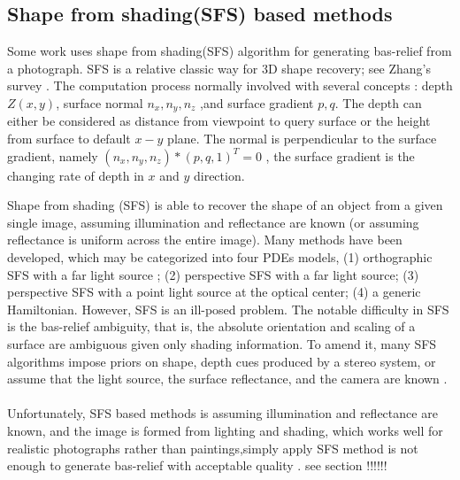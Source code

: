 \subsection{Shape from shading(SFS) based methods}
Some work uses shape from shading(SFS) algorithm for generating  bas-relief from a photograph. SFS is a relative classic way for 3D shape recovery; see Zhang's survey \cite{zhang1999shape}.  The computation process normally involved with several concepts : depth $Z(x,y)$, surface normal $n_x,n_y,n_z$ ,and surface gradient $p,q$. The depth can either be considered as distance from viewpoint to query surface or the height from surface to default $x-y$ plane. The normal is perpendicular to the surface gradient, namely $\left( n_x,n_y,n_z\right) * \left( p, q ,1\right)^T =0  $ , the surface gradient is the changing rate of depth in $x$ and $y$ direction.

Shape from shading (SFS) is able to recover the shape of an object from a given single image, assuming illumination and reflectance are known (or assuming reflectance is uniform across the entire image). Many methods have been developed, which may be categorized into four PDEs models\cite{prados2003perspective}, (1) orthographic SFS with a far light source \cite{lions1993shape}; (2) perspective SFS with a far light source\cite{prados2004unifying}; (3) perspective SFS with a point light source at the optical center\cite{prados2003perspective}; (4) a generic Hamiltonian. However, SFS is an ill-posed problem. The notable difficulty in SFS is the bas-relief ambiguity\cite{belhumeur1999bas}, that is, the absolute orientation and scaling of a surface are ambiguous given only shading information. To amend it, many SFS algorithms impose priors on shape, depth cues produced by a stereo system, or assume that the light source, the surface reflectance, and the camera are known\cite{zhang1999shape} \cite{alldrin2007resolving} \cite{johnson2011shape} \cite{barron2012color}.\\ \\
Unfortunately, SFS based methods is assuming illumination and reflectance are known, and the image is formed from lighting and shading, which works well for realistic photographs rather than paintings,simply apply SFS method is not enough to generate bas-relief with acceptable quality . see section  !!!!!!

